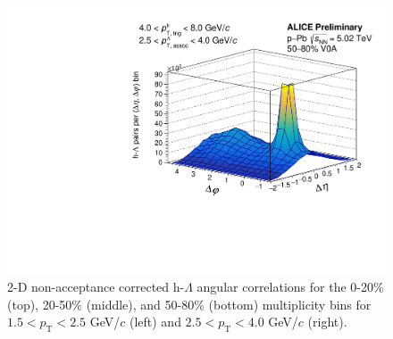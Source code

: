 \begin{figure}[ht]
\begin{minipage}{0.48\textwidth}
		\includegraphics[width=\textwidth]{figures/analysis/h_lambda_2d_nomixcor_fancy_label_50_80_highpt.pdf}
	\end{minipage}
	\caption{2-D non-acceptance corrected h-$\Lambda$ angular correlations for the 0-20\% (top), 20-50\% (middle), and 50-80\% (bottom) multiplicity bins for $1.5 < p_{\text{T}} < 2.5$ GeV/$c$ (left) and $2.5 < p_{\text{T}} < 4.0$ GeV/$c$ (right).}
	\label{fig:h_lambda_2d_nomixcor}
\end{figure}


